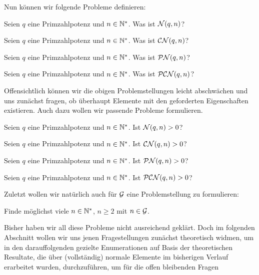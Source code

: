 Nun können wir folgende Probleme definieren:

\begin{problem}[$\cal N(q,n)=?$]
  \label{prob:n=}
  Seien $q$ eine Primzahlpotenz und $n\in \N^\ast$. Was ist
  $\cal N(q,n)$?
\end{problem}
\begin{problem}[$\CN(q,n)=?$]
  \label{prob:cn=}
  Seien $q$ eine Primzahlpotenz und $n\in \N^\ast$. Was ist
  $\CN(q,n)$?
\end{problem}
\begin{problem}[$\PN(q,n)=?$]
  \label{prob:pn=}
  Seien $q$ eine Primzahlpotenz und $n\in \N^\ast$. Was ist
  $\PN(q,n)$?
\end{problem}
\begin{problem}[$\PCN(q,n)=?$]
  \label{prob:pcn=}
  Seien $q$ eine Primzahlpotenz und $n\in \N^\ast$. Was ist
  $\PCN(q,n)$?
\end{problem}

Offensichtlich können wir die obigen Problemstellungen leicht abschwächen und
uns zunächst fragen, ob überhaupt Elemente mit den geforderten Eigenschaften
existieren. Auch dazu wollen wir passende Probleme formulieren.

\begin{problem}[$\cal N(q,n)>0?$]
  \label{prob:n>0}
  Seien $q$ eine Primzahlpotenz und $n\in \N^\ast$. Ist
  $\cal N(q,n)>0$?
\end{problem}
\begin{problem}[$\CN(q,n)>0?$]
  \label{prob:cn>0}
  Seien $q$ eine Primzahlpotenz und $n\in \N^\ast$. Ist
  $\CN(q,n)>0$?
\end{problem}
\begin{problem}[$\PN(q,n)>0?$]
  \label{prob:pn>0}
  Seien $q$ eine Primzahlpotenz und $n\in \N^\ast$. Ist
  $\PN(q,n)>0$?
\end{problem}
\begin{problem}[$\PCN(q,n)>0?$]
  \label{prob:pcn>0}
  Seien $q$ eine Primzahlpotenz und $n\in \N^\ast$. Ist
  $\PCN(q,n)>0$?
\end{problem}


Zuletzt wollen wir natürlich auch für $\G$ eine Problemstellung 
zu formulieren:

\begin{problem}[$n\in \G ?$]
  Finde möglichst viele $n\in \N^\ast$, $n\geq 2$ mit $n\in \G$.
\end{problem}

Bisher haben wir all diese Probleme nicht ausreichend geklärt. Doch im
folgenden Abschnitt wollen wir uns jenen Fragestellungen zunächst theoretisch
widmen, um in den darauffolgenden gezielte Enumerationen auf Basis der
theoretischen Resultate, die über (vollständig) normale Elemente im bisherigen
Verlauf erarbeitet wurden, durchzuführen, um für die offen bleibenden Fragen 



